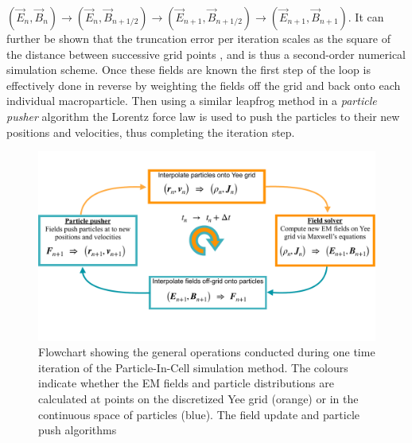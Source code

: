$\left(\vec{E}_n,\vec{B}_n\right) \to (\vec{E}_n,\vec{B}_{n+1/2}) \to (\vec{E}_{n+1},\vec{B}_{n+1/2})  \to  (\vec{E}_{n+1},\vec{B}_{n+1})$. It can further be shown that the truncation error per iteration scales as the square of the distance between successive grid points \cite{Lawrence-Douglas2013}, and is thus a second-order numerical simulation scheme. Once these fields are known the first step of the loop is effectively done in reverse by weighting the fields off the grid and back onto each individual macroparticle. Then using a similar leapfrog method in a \textit{particle pusher} algorithm the Lorentz force law is used to push the particles to their new positions and velocities, thus completing the iteration step. 
\begin{figure}
\centering
\includegraphics[width=\textwidth]{PIC_loop2.pdf}\vspace{-30pt}
\caption{\small{Flowchart showing the general operations conducted during one time iteration of the Particle-In-Cell simulation method. The colours indicate whether the EM fields and particle distributions are calculated at points on the discretized Yee grid (orange) or in the continuous space of particles (blue). The field update and particle push algorithms}}
\label{PIC_loop}
\end{figure}


